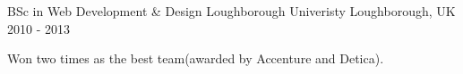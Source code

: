 

\begin{cventries}

  \cventry
    {BSc in Web Development \& Design} %
    {Loughborough Univeristy} %
    {Loughborough, UK} %
    {2010 - 2013} %
    {
      \begin{cvitems} %
        \item {Won two times as the best team(awarded by Accenture and Detica).}
      \end{cvitems}
    }

\end{cventries}
